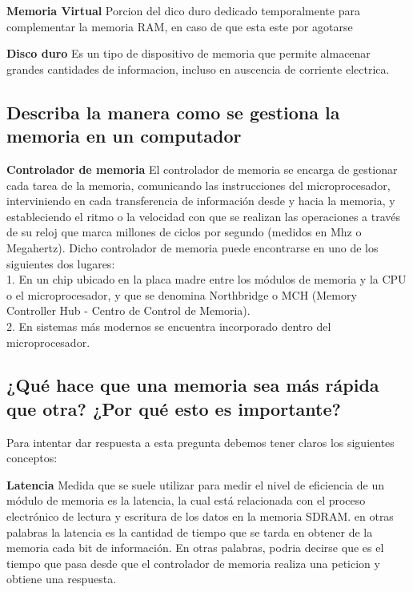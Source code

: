 \documentclass{article}
\begin{document}
\begin{tcolorbox}[colupper=red!75!black]
	\textbf{Memoria Virtual}
	\tcblower
	Porcion del dico duro dedicado temporalmente para complementar la memoria RAM, en caso de que esta este por agotarse
\end{tcolorbox}

\begin{tcolorbox}[colupper=red!75!black]
	\textbf{Disco duro}
	\tcblower
	Es un tipo de dispositivo de memoria que permite almacenar grandes cantidades de informacion, incluso en auscencia de corriente electrica.
\end{tcolorbox}

\subsection{Describa la manera como se gestiona la memoria en un computador}
\begin{tcolorbox}[colupper=red!75!black]
	\textbf{Controlador de memoria}
	\tcblower
	El controlador de memoria se encarga de gestionar cada tarea de la memoria, comunicando las instrucciones del microprocesador, interviniendo en cada transferencia de información desde y hacia la memoria, y estableciendo el ritmo o la velocidad con que se realizan las operaciones a través de su reloj que marca millones de ciclos por segundo (medidos en Mhz o Megahertz).
	\vspace{0.1cm}
	Dicho controlador de memoria puede encontrarse en uno de los siguientes dos lugares:\\
	1. En un chip ubicado en la placa madre entre los módulos de memoria y la CPU o el microprocesador, y que se denomina Northbridge o MCH (Memory Controller Hub - Centro de Control de Memoria).\\
	2. En sistemas más modernos se encuentra incorporado dentro del microprocesador.
\end{tcolorbox}

\subsection{¿Qué hace que una memoria sea más rápida que otra? ¿Por qué esto es importante?}
Para intentar dar respuesta a esta pregunta debemos tener claros los siguientes conceptos:\\
\begin{tcolorbox}[colupper=red!75!black]
	\textbf{Latencia}
	\tcblower
	Medida que se suele utilizar para medir el nivel de eficiencia de un módulo de memoria es
	la latencia, la cual está relacionada con el proceso electrónico de lectura y escritura de los datos en la memoria SDRAM. en otras palabras la latencia es la cantidad de tiempo que se tarda en obtener de la memoria cada bit de información. En otras palabras, podria decirse que es el tiempo que pasa desde que el controlador de memoria realiza una peticion y obtiene una respuesta.
\end{tcolorbox}
\end{document}
